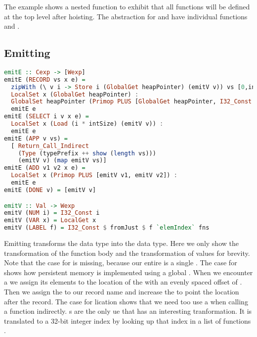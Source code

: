 The example shows a nested function to exhibit that all functions will be defined at the top level after hoisting. The abstraction for  and  have individual functions  and .

\subsection{\label{section:emit}Emitting}
\begin{lstlisting}[language=Haskell]
emitE :: Cexp -> [Wexp]
emitE (RECORD vs x e) =
  zipWith (\ v i -> Store i (GlobalGet heapPointer) (emitV v)) vs [0,intSize..] ++
  LocalSet x (GlobalGet heapPointer) :
  GlobalSet heapPointer (Primop PLUS [GlobalGet heapPointer, I32_Const (length vs * intSize)]) :
  emitE e
emitE (SELECT i v x e) =
  LocalSet x (Load (i * intSize) (emitV v)) :
  emitE e
emitE (APP v vs) =
  [ Return_Call_Indirect
    (Type (typePrefix ++ show (length vs)))
    (emitV v) (map emitV vs)]
emitE (ADD v1 v2 x e) =
  LocalSet x (Primop PLUS [emitV v1, emitV v2]) :
  emitE e
emitE (DONE v) = [emitV v]

emitV :: Val -> Wexp
emitV (NUM i) = I32_Const i
emitV (VAR x) = LocalGet x
emitV (LABEL f) = I32_Const $ fromJust $ f `elemIndex` fns
\end{lstlisting}

Emitting transforms the  data type into the  data type. Here we only show the transformation of the function body  and the transformation of values  for brevity. Note that the case for  is missing, because our entire  is a single . The case for  shows how persistent memory is implemented using a global . When we encounter a  we assign its elements  to the location of the  with an evenly spaced offset of . Then we assign the  to our record name and increase the  to point the location after the record. The case for lication shows that we need too use a  when calling a function indirectly. s are the only ue that has an interesting tranformation. It is translated to a 32-bit integer index by looking up that index in a list of functions .

